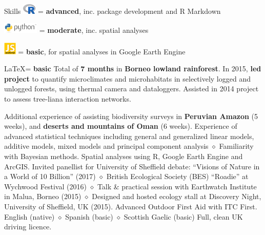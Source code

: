 
\begin{rubric}{Skills}
    \includegraphics[height=0.5cm]{Rlogo.png} = \textbf {advanced}, inc. package development and R Markdown
    \par \includegraphics[height=0.5cm]{python-logo.png} = \textbf{moderate}, inc. spatial analyses
    \par \includegraphics[height=0.6cm]{javascript-logo.jpg} = \textbf{basic}, for spatial analyses in Google Earth Engine
    \par \LaTeX = \textbf{basic}
\entry*[Fieldwork]
    Total of \textbf{7 months} in \textbf{Borneo lowland rainforest}. In 2015, \textbf{led project} to quantify microclimates and microhabitats in selectively logged and unlogged forests, using thermal camera and dataloggers. Assisted in 2014 project to assess tree-liana interaction networks.
    \par \hfill
    \par Additional experience of assisting biodiversity surveys in \textbf{Peruvian Amazon} (5 weeks), and \textbf{deserts and mountains of Oman} (6 weeks).
	Experience of advanced statistical techniques including general and generalized linear models, additive models, mixed models and principal component analysis $\diamond$ Familiarity with Bayesian methods.
\entry*[GIS]
	Spatial analyses using R, Google Earth Engine and ArcGIS.
	Invited panellist for University of Sheffield debate: ``Visions of Nature in a World of 10 Billion'' (2017) $\diamond$ British Ecological Society (BES) ``Roadie'' at Wychwood Festival (2016) $\diamond$ Talk \& practical session with Earthwatch Institute in Malua, Borneo (2015) $\diamond$ Designed and hosted ecology stall at Discovery Night, University of Sheffield, UK (2015).
	Advanced Outdoor First Aid with ITC First.
\entry*[Languages]
	English (native) $\diamond$ Spanish (basic) $\diamond$ Scottish Gaelic (basic)
\entry*[Driving]
	Full, clean UK driving licence.
\end{rubric}
